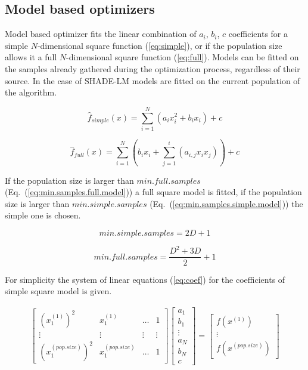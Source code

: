 \documentclass[sigconf]{acmart}
\begin{document}
\subsection{Model based optimizers}

Model based optimizer fits the linear combination
of $a_i$, $b_i$, $c$ coefficients for a simple
$N$-dimensional square function (\ref{eq:simple}), or if the population
size allows it a full $N$-dimensional square function (\ref{eq:full}).
Models can be fitted on the samples already gathered during the optimization process,
regardless of their source.
In the case of SHADE-LM models are fitted on the current population of the algorithm.

\begin{equation}
	\hat{f}_{simple}(x) = \sum\limits_{i=1}^{N}(a_ix_i^2 + b_ix_i) + c
	\label{eq:simple}
\end{equation}

\begin{equation}
	\hat{f}_{full}(x) = \sum\limits_{i=1}^{N} \left( b_ix_i + \sum\limits_{j=1}^{i}(a_{i,j}x_ix_j )\right) + c
	\label{eq:full}
\end{equation}

If the population size is larger than $min.full.samples$ (Eq.~(\ref{eq:min.samples.full.model}))
a full square model is fitted, if the population size is larger than $min.simple.samples$
(Eq.~(\ref{eq:min.samples.simple.model})) the simple one is chosen.

\begin{equation}
	min.simple.samples = 2D + 1
	\label{eq:min.samples.simple.model}
\end{equation}

\begin{equation}
	min.full.samples = \dfrac{D^2+ 3D}{2} + 1
	\label{eq:min.samples.full.model}
\end{equation}

For simplicity the system of linear equations (\ref{eq:coef}) for the coefficients of simple square model is given.

\begin{align}
	\begin{bmatrix}
		(x^{(1)}_1)^2 & x^{(1)}_1 &  \ldots & 1 \\           
   \vdots & \vdots  & \vdots &  \vdots  \\
   (x^{(pop.size)}_1)^2 & x^{(pop.size)}_1 & \ldots & 1
  \end{bmatrix} 
  \begin{bmatrix}
	a_{1} \\           
	b_{1} \\           
	\vdots \\
	a_{N} \\           
	b_{N} \\           
	c
   \end{bmatrix}
	=
	\begin{bmatrix}
		f(x^{(1)}) \\           
		\vdots \\
		f(x^{(pop.size)})
	   \end{bmatrix}
	 \label{eq:coef}
\end{align}
\end{document}
